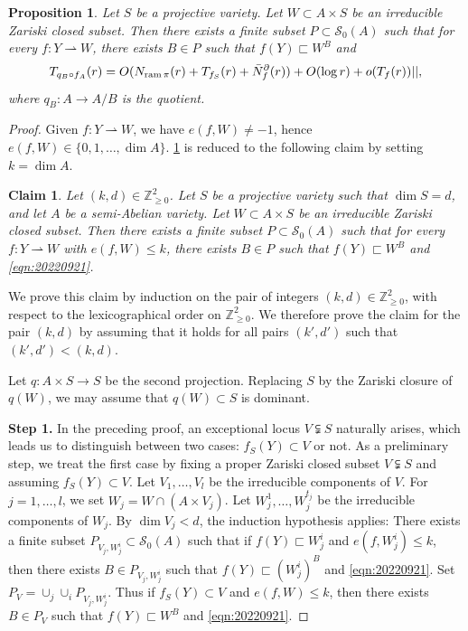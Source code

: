 \documentclass[11pt,english]{smfart}
\theoremstyle{plain}
\newtheorem{claim}[thm]{Claim}
\newtheorem{proposition}[thm]{Proposition}
\theoremstyle{definition}
\theoremstyle{remark}
\numberwithin{equation}{section}
\theoremstyle{plain}
\newcommand{\da}{\rightharpoonup}
\newcommand{\pN}[1]{\bar{N}_{#1}^{\partial}}
\newcommand{\ram}{{\rm ram}\,}
\begin{document}
	\begin{proposition}\label{pro:20220807}
		Let $S$ be a projective variety.
		Let $W\subset A\times S$ be an irreducible Zariski closed subset.
		Then there exists a finite subset $P\subset \mathcal{S}_0(A)$ such that 
		for every $f:Y\da W$, there exists $B\in P$ such that $f(Y)\sqsubset W^B$ and
		\begin{equation}\label{eqn:20220921}
			T_{q_B\circ f_A}(r)=O(N_{\ram \pi}(r)+T_{f_S}(r)+\pN{f}(r))+O(\log r)+o(T_f(r))||,
		\end{equation}
		where $q_B:A\to A/B$ is the quotient.
	\end{proposition}
	
	\begin{proof}
		Given $f:Y\da W$, we have $e(f,W)\not=-1$, hence $e(f,W)\in\{0,1,\ldots,\dim A\}$.
		\cref{pro:20220807} is reduced to the following claim by setting $k=\dim A$.
		
		\medskip
		
		\begin{claim}
		Let $(k,d)\in\mathbb Z_{\geq 0}^2$.
		Let $S$ be a projective variety such that $\dim S=d$, and let $A$ be a semi-Abelian variety.
		Let $W\subset A\times S$ be an irreducible Zariski closed subset.
			Then there exists a finite subset $P\subset \mathcal{S}_0(A)$ such that for every $f:Y\da W$ with $e(f,W)\leq k$, there exists $B\in P$ such that $f(Y)\sqsubset W^B$ and \eqref{eqn:20220921}. 
		\end{claim}
		\medskip
		
		We prove this claim by induction on the pair of integers $(k,d)\in\mathbb Z_{\geq 0}^2$, with respect to the lexicographical order on $\mathbb Z_{\geq 0}^2$.
		We therefore prove the claim for the pair $(k,d)$ by assuming that it holds for all pairs $(k',d')$ such that $(k',d')<(k,d)$.
		
		Let $q:A\times S\to S$ be the second projection.
		Replacing $S$ by the Zariski closure of $q(W)$, we may assume that $q(W)\subset S$ is dominant. 
		
\textbf{Step 1.}
In the preceding proof, an exceptional locus  $V\subsetneqq S$ naturally arises, which leads us to distinguish between two cases: $f_S(Y)\subset V$ or not.
 As a preliminary step, we treat the first case by fixing a proper Zariski closed subset $V\subsetneqq S$ and assuming $f_S(Y)\subset V$.
Let $V_1,\ldots ,V_l$ be the irreducible components of $V$.
		For $j=1,\ldots ,l$, we set $W_j=W\cap (A\times V_j)$.
		Let $W_j^1,\ldots,W_j^{t_j}$ be the irreducible components of $W_j$.
		By $\dim V_j<d$, the induction hypothesis applies: There exists a finite subset $P_{V_j,W_j^i}\subset \mathcal{S}_0(A)$ such that if $f(Y)\sqsubset W_j^i$ and $e(f,W_j^i)\leq k$, then there exists $B\in P_{V_j,W_j^i}$ such that $f(Y)\sqsubset (W_j^i)^B$ and \eqref{eqn:20220921}.
		Set $P_V=\cup_j\cup_iP_{V_j,W_j^i}$.
		Thus if $f_S(Y)\subset V$ and $e(f,W)\leq k$, then there exists $B\in P_{V}$ such that $f(Y)\sqsubset W^B$ and \eqref{eqn:20220921}.
		

\end{proof}
\end{document}
